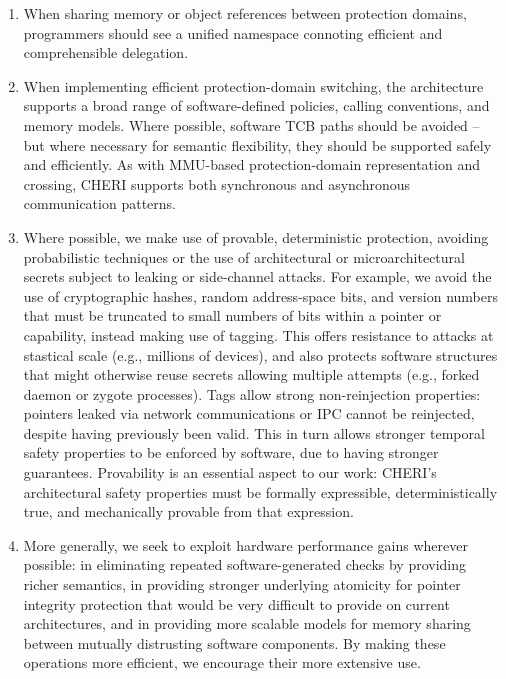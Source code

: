 \begin{enumerate}
\item When sharing memory or object references between protection domains,
  programmers should see a unified namespace connoting efficient and
  comprehensible delegation.

\item When implementing efficient protection-domain switching, the
  architecture supports a broad range of software-defined policies, calling
  conventions, and memory models.
  Where possible, software TCB paths should be avoided -- but where necessary
  for semantic flexibility, they should be supported safely and efficiently.
  As with MMU-based protection-domain representation and crossing, CHERI
  supports both synchronous and asynchronous communication patterns.

\item Where possible, we make use of provable, deterministic protection,
  avoiding probabilistic techniques or the use of architectural or
  microarchitectural secrets subject to leaking or side-channel attacks.
  For example, we avoid the use of cryptographic hashes, random address-space
  bits, and version numbers that must be truncated to small numbers of bits
  within a pointer or capability, instead making use of tagging.
  This offers resistance to attacks at stastical scale (e.g., millions of
  devices), and also protects software structures that might otherwise reuse
  secrets allowing multiple attempts (e.g., forked daemon or zygote
  processes).
  Tags allow strong non-reinjection properties: pointers leaked via network
  communications or IPC cannot be reinjected, despite having previously been
  valid.
  This in turn allows stronger temporal safety properties to be enforced by
  software, due to having stronger guarantees.
  Provability is an essential aspect to our work: CHERI's architectural
  safety properties must be formally expressible, deterministically true, and
  mechanically provable from that expression.

\item More generally, we seek to exploit hardware performance gains wherever
  possible: in eliminating repeated software-generated checks by providing
  richer semantics, in providing stronger underlying atomicity for pointer
  integrity protection that would be very difficult to provide on current
  architectures, and in providing more scalable models for memory sharing
  between mutually distrusting software components.
  By making these operations more efficient, we encourage their more extensive
  use.

\end{enumerate}


